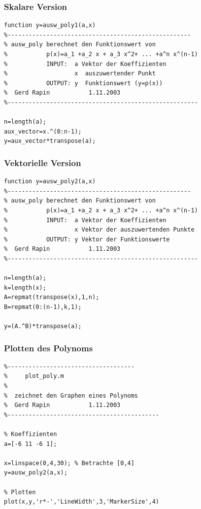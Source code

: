 \begin{frame}[fragile]\frametitle{Skalare Version}
\begin{lstlisting}
function y=ausw_poly1(a,x)
%----------------------------------------------------
% ausw_poly berechnet den Funktionswert von 
%           p(x)=a_1 +a_2 x + a_3 x^2+ ... +a^n x^(n-1)
%           INPUT:  a Vektor der Koeffizienten 
%                   x  auszuwertender Punkt
%           OUTPUT: y  Funktionswert (y=p(x))
%  Gerd Rapin           1.11.2003
%------------------------------------------------------

n=length(a);
aux_vector=x.^(0:n-1);
y=aux_vector*transpose(a);
\end{lstlisting}
\end{frame}
\begin{frame}[fragile]\frametitle{Vektorielle Version}
\begin{lstlisting}
function y=ausw_poly2(a,x)
%----------------------------------------------------
% ausw_poly berechnet den Funktionswert von 
%           p(x)=a_1 +a_2 x + a_3 x^2+ ... +a^n x^(n-1)
%           INPUT:  a Vektor der Koeffizienten 
%                   x Vektor der auszuwertenden Punkte
%           OUTPUT: y Vektor der Funktionswerte
%  Gerd Rapin           1.11.2003
%------------------------------------------------------

n=length(a);
k=length(x);
A=repmat(transpose(x),1,n);
B=repmat(0:(n-1),k,1);

y=(A.^B)*transpose(a);
\end{lstlisting}
\end{frame}
\begin{frame}[fragile]\frametitle{Plotten des Polynoms}
\begin{lstlisting}
%------------------------------------
%     plot_poly.m 
%   
%  zeichnet den Graphen eines Polynoms
%  Gerd Rapin           1.11.2003
%-------------------------------------------

% Koeffizienten
a=[-6 11 -6 1]; 

x=linspace(0,4,30); % Betrachte [0,4]
y=ausw_poly2(a,x);

% Plotten
plot(x,y,'r*-','LineWidth',3,'MarkerSize',4)
\end{lstlisting}
\end{frame}
